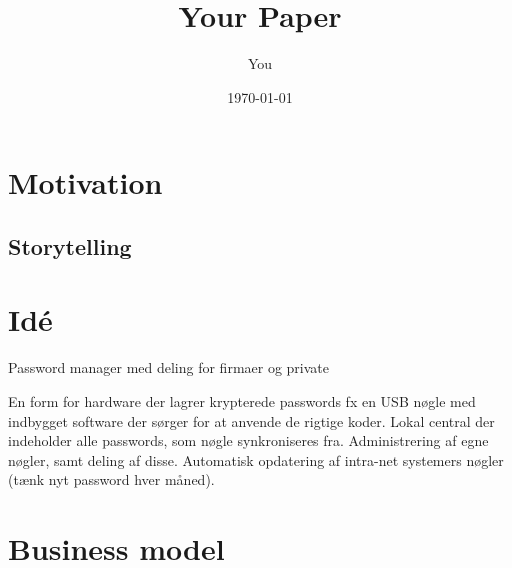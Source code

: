 \documentclass[a4paper]{article}
\title{Your Paper}
\author{You}
\date{\today}
\begin{document}
\maketitle

\section{Motivation}
\subsection{Storytelling}
\section{Idé}

Password manager med deling for firmaer og private

En form for hardware der lagrer krypterede passwords fx en USB nøgle med indbygget software der sørger for at anvende de rigtige koder.
Lokal central der indeholder alle passwords, som nøgle synkroniseres fra.
Administrering af egne nøgler, samt deling af disse.
Automatisk opdatering af intra-net systemers nøgler (tænk nyt password hver måned).

\section{Business model}
\end{document}
